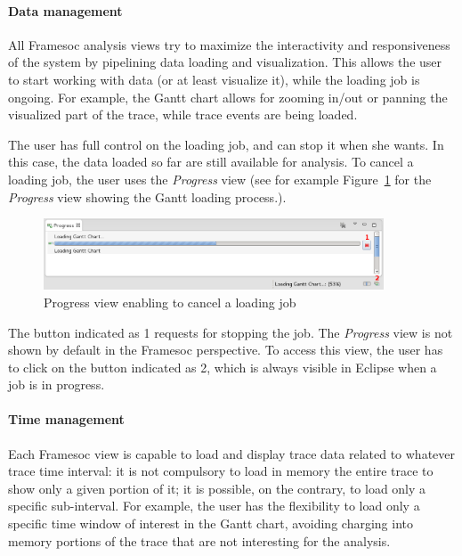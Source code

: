 \documentclass[twoside]{article}
\begin{document}
\begin{sloppypar}
\paragraph{Data management} 

All Framesoc analysis views try to maximize the interactivity and responsiveness of the system by pipelining data loading and visualization. This allows the user to start working with data (or at least visualize it), while the loading job is ongoing. For example, the Gantt chart allows for zooming in/out or panning the visualized part of the trace, while trace events are being loaded. 

The user has full control on the loading job, and can stop it when she wants. In this case, the data loaded so far are still available for analysis. To cancel a loading job, the user uses the \emph{Progress} view (see for example Figure~\ref{fig:progress} for the \emph{Progress} view showing the Gantt loading process.).

\begin{figure}[h!]
  \centering
    \includegraphics[width=0.9\textwidth]{images/loading.png}
  \caption{Progress view enabling to cancel a loading job}
  \label{fig:progress}
\end{figure}

The button indicated as \num{1} requests for stopping the job. The \emph{Progress} view is not shown by default in the Framesoc perspective. To access this view, the user has to click on the button indicated as \num{2}, which is always visible in Eclipse when a job is in progress.

\paragraph{Time management} Each Framesoc view is capable to load and display trace data related to whatever trace time interval: it is not compulsory to load in memory the entire trace to show only a given portion of it; it is possible, on the contrary, to load only a specific sub-interval. For example, the user has the flexibility to load only a specific time window of interest in the Gantt chart, avoiding charging into memory portions of the trace that are not interesting for the analysis.


\end{sloppypar}
\end{document}

